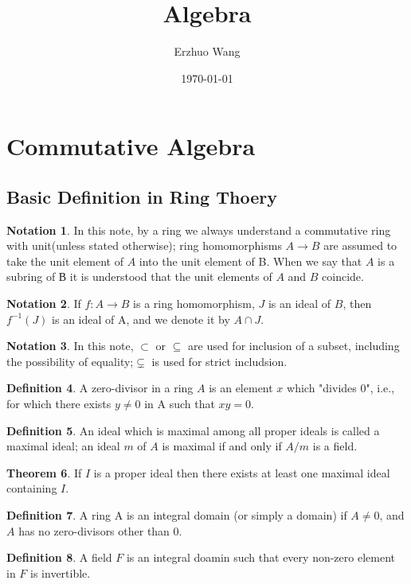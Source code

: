 \documentclass[a4paper,12pt]{article}
\title{Algebra}
\date{\today}
\author{Erzhuo Wang}
\theoremstyle{definition}
\newtheorem{defn}{Definition}[subsection]
\newtheorem{theo}[defn]{Theorem}
\newtheorem{nota}[defn]{Notation}
\begin{document}
\maketitle
\tableofcontents
\newpage
\section{Commutative Algebra}
\subsection{Basic Definition in Ring Thoery}
\begin{nota}
    In this note, by a ring we always understand a commutative ring with
    unit(unless stated otherwise); ring homomorphisms $A\rightarrow B$ are assumed to take the unit element
    of $A$ into the unit element of B. When we say that $A$ is a subring of $В$
    it is understood that the unit elements of $A$ and $B$ coincide.
\end{nota}
\begin{nota}
    If $f:A\rightarrow B$ is a ring homomorphism, $J$ is an ideal of $B$, then $f^{-1}(J)$ is an ideal of A, and we denote it by $A\cap J$.
\end{nota}
\begin{nota}
    In this note, $\subset$ or $\subseteq$ are used for inclusion of a subset, including the possibility of
    equality;$\subsetneq$ is used for strict includsion.
\end{nota}
\begin{defn}
    A zero-divisor in a ring $A$ is an element $x$ which "divides 0", i.e., for which there
    exists $y\neq 0$ in A such that $xy = 0$.
\end{defn}
\begin{defn}
    An ideal which is maximal among all proper ideals is called a maximal
    ideal; an ideal $m$ of $A$ is maximal if and only if $A/m$ is a field.
\end{defn}
\begin{theo}
    If $I$ is a proper ideal then there exists at least one maximal
    ideal containing $I$.
\end{theo}
\begin{defn}
    A ring A is an integral domain (or simply a
    domain) if $ A\neq 0$, and $A$ has no zero-divisors other than 0.
\end{defn}
\begin{defn}
   A field $F$ is an integral doamin such that every non-zero element in $F$ is invertible.
\end{defn}
\end{document}
